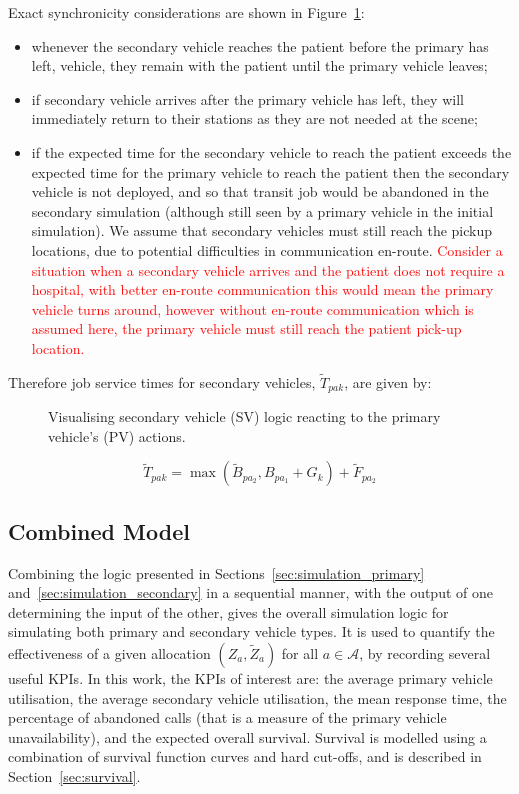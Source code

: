 \documentclass[numbers,webpdf,imaman]{ima-authoring-template}%
\begin{document}
Exact synchronicity considerations are shown in Figure~\ref{fig:sequential_logic}:
\begin{itemize}
  \item whenever the secondary vehicle reaches the patient before the primary
  has left, vehicle, they remain with the patient until the primary vehicle
  leaves;
  \item if secondary vehicle arrives after the primary vehicle has left, they
  will immediately return to their stations as they are not needed at the scene;
  \item if the expected time for the secondary vehicle to reach the patient
  exceeds the expected time for the primary vehicle to reach the patient then
  the secondary vehicle is not deployed, and so that transit job would be
  abandoned in the secondary simulation (although still seen by a primary
  vehicle in the initial simulation). We assume that secondary vehicles must
  still reach the pickup locations, due to potential difficulties in
  communication en-route. \textcolor{red}{Consider a situation when a
  secondary vehicle arrives and the patient does not require a hospital, with
  better en-route communication this would mean the primary vehicle turns
  around, however without en-route communication which is assumed here, the
  primary vehicle must still reach the patient pick-up location.}
\end{itemize}

Therefore job service times for secondary vehicles, $\tilde{T}_{pak}$, are
given by:

\begin{figure}
    \centering
    
    \caption{Visualising secondary vehicle (SV) logic reacting to the primary
    vehicle's (PV) actions.}
    \label{fig:sequential_logic}
\end{figure}

\begin{equation}
  \tilde{T}_{pak} = \max\left(\tilde{B}_{pa_2}, B_{pa_1} + G_k \right) + \tilde{F}_{pa_2}
\end{equation}

\subsection{Combined Model}\label{sec:combined_model}
Combining the logic presented in Sections~\ref{sec:simulation_primary}
and~\ref{sec:simulation_secondary} in a sequential manner, with the output of
one determining the input of the other, gives the overall simulation logic for
simulating both primary and secondary vehicle types. It is used to quantify
the effectiveness of a given allocation $(Z_a, \tilde{Z}_a)$ for all
$a \in \mathcal{A}$, by recording several useful KPIs.
In this work, the KPIs of interest are: the average primary vehicle
utilisation, the average secondary vehicle utilisation, the mean response
time, the percentage of abandoned calls (that is a measure of the primary
vehicle unavailability), and the expected overall survival. Survival is
modelled using a combination of survival function curves and hard cut-offs,
and is described in Section~\ref{sec:survival}.
\end{document}
